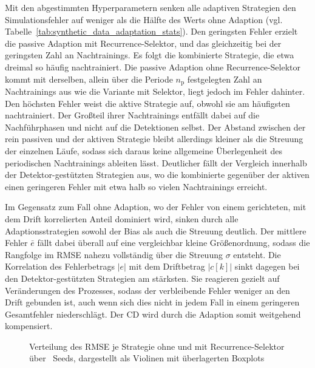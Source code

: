 Mit den abgestimmten Hyperparametern senken alle adaptiven Strategien den Simulationsfehler auf weniger als die Hälfte des Werts ohne Adaption (vgl. Tabelle~\ref{tab:synthetic_data_adaptation_stats}). Den geringsten Fehler erzielt die passive Adaption mit Recurrence-Selektor, und das gleichzeitig bei der geringsten Zahl an Nachtrainings. Es folgt die kombinierte Strategie, die etwa dreimal so häufig nachtrainiert. Die passive Adaption ohne Recurrence-Selektor kommt mit derselben, allein über die Periode $n_{\mathrm{p}}$ festgelegten Zahl an Nachtrainings aus wie die Variante mit Selektor, liegt jedoch im Fehler dahinter. Den höchsten Fehler weist die aktive Strategie auf, obwohl sie am häufigsten nachtrainiert. Der Großteil ihrer Nachtrainings entfällt dabei auf die Nachführphasen und nicht auf die Detektionen selbst. Der Abstand zwischen der rein passiven und der aktiven Strategie bleibt allerdings kleiner als die Streuung der einzelnen Läufe, sodass sich daraus keine allgemeine Überlegenheit des periodischen Nachtrainings ableiten lässt. Deutlicher fällt der Vergleich innerhalb der Detektor-gestützten Strategien aus, wo die kombinierte gegenüber der aktiven einen geringeren Fehler mit etwa halb so vielen Nachtrainings erreicht. \par
%
Im Gegensatz zum Fall ohne Adaption, wo der Fehler von einem gerichteten, mit dem Drift korrelierten Anteil dominiert wird, sinken durch alle Adaptionsstrategien sowohl der Bias als auch die Streuung deutlich. Der mittlere Fehler $\bar{e}$ fällt dabei überall auf eine vergleichbar kleine Größenordnung, sodass die Rangfolge im \ac{RMSE} nahezu vollständig über die Streuung $\sigma$ entsteht. Die Korrelation des Fehlerbetrags $|e|$ mit dem Driftbetrag $|c[k]|$ sinkt dagegen bei den Detektor-gestützten Strategien am stärksten. Sie reagieren gezielt auf Veränderungen des Prozesses, sodass der verbleibende Fehler weniger an den Drift gebunden ist, auch wenn sich dies nicht in jedem Fall in einem geringeren Gesamtfehler niederschlägt. Der \ac{CD} wird durch die Adaption somit weitgehend kompensiert. \par
%
\begin{figure}[tbp]
    \centering
    \makebox[\textwidth][c]{%
        
    }
    \caption{Verteilung des \ac{RMSE} je Strategie ohne und mit Recurrence-Selektor über \adaptNSeeds\ Seeds, dargestellt als Violinen mit überlagerten Boxplots}
    \label{fig:synthetic_data_adaptation_seed_violin}
\end{figure}
%
